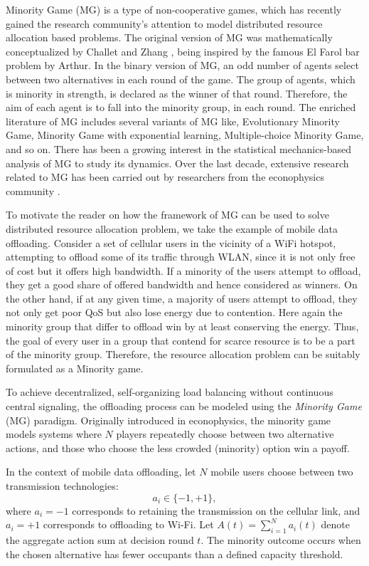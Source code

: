 Minority Game (MG) is a type of non-cooperative games, which has recently gained 
the research community's attention to model distributed resource allocation based problems. 
The original version of MG was mathematically conceptualized by Challet and Zhang \cite{Challet23}, 
being inspired by the famous El Farol bar problem \cite{Arthur22} by Arthur. 
In the binary version of MG, an odd number of agents select between two alternatives in 
each round of the game. The group of agents, which is minority in strength, is declared as 
the winner of that round. Therefore, the aim of each agent is to fall into the minority group, in each round.
The enriched literature of MG includes several variants of MG like, Evolutionary Minority Game, Minority Game with exponential learning, Multiple-choice Minority Game, and so on. There has been a growing interest in the statistical mechanics-based analysis of MG to study its dynamics. Over the last decade, extensive research related to MG has been carried out by researchers from the econophysics community \cite{MGBook_33}. 

To motivate the reader on how the framework of MG can be used to solve distributed resource allocation problem, we take the example of mobile data offloading. Consider a set of cellular users in the vicinity of a WiFi hotspot, attempting to offload some of its traffic through WLAN, since it is not only free of cost but it offers high bandwidth. If a minority of the users attempt to offload, they get a good share of offered bandwidth and hence considered as winners. On the other hand, if at any given time, a majority of users attempt to offload, they not only get poor QoS but also lose energy due to contention. Here again the minority group that differ to offload win by at least  conserving the energy. Thus, the goal of every user in a group that contend for scarce resource is to be a part of the minority group. Therefore, the resource allocation problem can be suitably formulated as a Minority game.

To achieve decentralized, self-organizing load balancing without continuous central signaling, the offloading process can be modeled using the \emph{Minority Game} (MG) paradigm. Originally introduced in econophysics, the minority game models systems where $N$ players repeatedly choose between two alternative actions, and those who choose the less crowded (minority) option win a payoff.

In the context of mobile data offloading, let $N$ mobile users choose between two transmission technologies:
\begin{equation}
    a_i \in \{-1, +1\},
\end{equation}
where $a_i = -1$ corresponds to retaining the transmission on the cellular link, and $a_i = +1$ corresponds to offloading to Wi-Fi. Let $A(t) = \sum_{i=1}^N a_i(t)$ denote the aggregate action sum at decision round $t$. The minority outcome occurs when the chosen alternative has fewer occupants than a defined capacity threshold.

